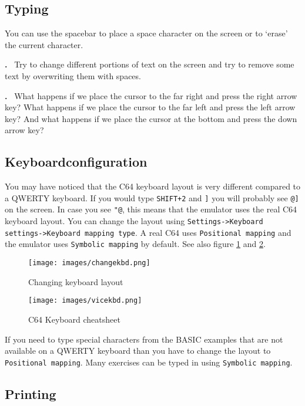 \documentclass{article}
\newcounter{problem}
\newcounter{solution}
\newcommand\problem{%
  \stepcounter{problem}%
  \textbf{\theproblem.}~%
  \setcounter{solution}{0}%
}
\begin{document}
\subsection{Typing}

You can use the spacebar to place a space character on the screen or to `erase' the current character.

\problem Try to change different portions of text on the screen and try to remove some text by overwriting them with spaces.

\problem What happens if we place the cursor to the far right and press the right arrow key?
What happens if we place the cursor to the far left and press the left arrow key?
And what happens if we place the cursor at the bottom and press the down arrow key?

\subsection{Keyboardconfiguration}

You may have noticed that the C64 keyboard layout is very different compared to a QWERTY keyboard.
If you would type \verb:SHIFT+2: and \verb:]: you will probably see \verb:@]: on the screen.
In case you see \verb:"@:, this means that the emulator uses the real C64 keyboard layout.
You can change the layout using \verb:Settings->Keyboard settings->Keyboard mapping type:.
A real C64 uses \verb:Positional mapping: and the emulator uses \verb:Symbolic mapping: by default.
See also figure \ref{fig:changekbd} and \ref{fig:vicekbd}.

\begin{figure}
\centering
\texttt{[image: images/changekbd.png]}
\caption{Changing keyboard layout}
\label{fig:changekbd}
\end{figure}

\begin{figure}
\centering
\texttt{[image: images/vicekbd.png]}
\caption{C64 Keyboard cheatsheet}
\label{fig:vicekbd}
\end{figure}

If you need to type special characters from the BASIC examples that are not available on a QWERTY keyboard than you have to change the layout to \verb:Positional mapping:.
Many exercises can be typed in using \verb:Symbolic mapping:.

\subsection{Printing}
\end{document}

